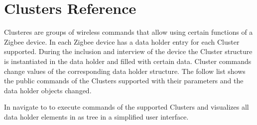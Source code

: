 \chapter{Clusters Reference}
\label{cls}
\label{Clusters}

Clusteres are groups of wireless commands that allow using certain functions of a Zigbee device.
In \zway each Zigbee device has a data holder entry for each Cluster supported. During the inclusion 
and interview of the device the Cluster structure is instantiated in the data holder and filled with 
certain data. Cluster commands change values of the corresponding data holder structure. The follow 
list shows the public commands of the Clusters supported with their parameters and the data holder 
objects changed.

In \zweui navigate to  to execute commands 
of the supported Clusters and visualizes all data holder elements in as tree in 
a simplified user interface.
